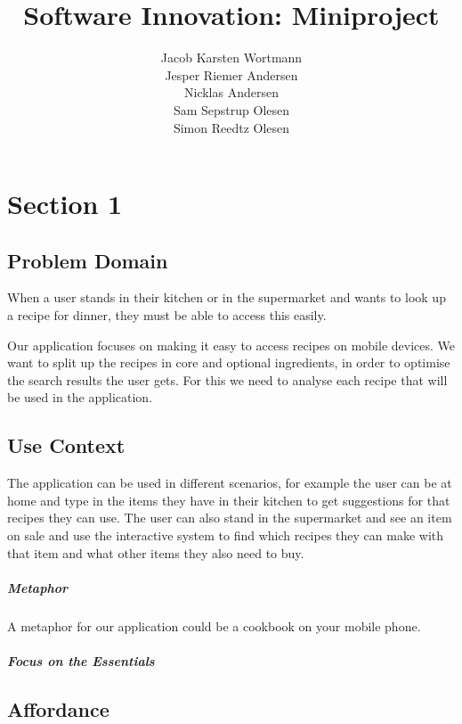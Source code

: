 \documentclass[a4paper,12pt]{memoir}
\title{Software Innovation: Miniproject}
\author{Jacob Karsten Wortmann\\Jesper Riemer Andersen\\Nicklas Andersen\\Sam Sepstrup Olesen\\Simon Reedtz Olesen}
\begin{document}
\maketitle

\chapter*{Section 1}

\section*{Problem Domain}

When a user stands in their kitchen or in the supermarket and wants to look up a recipe for dinner, they must be able to access this easily.

Our application focuses on making it easy to access recipes on mobile devices. We want to split up the recipes in core and optional ingredients, in order to optimise the search results the user gets. For this we need to analyse each recipe that will be used in the application.

\section*{Use Context}

The application can be used in different scenarios, for example the user can be at home and type in the items they have in their kitchen to get suggestions for that recipes they can use. The user can also stand in the supermarket and see an item on sale and use the interactive system to find which recipes they can make with that item and what other items they also need to buy. 

\paragraph{Metaphor}

A metaphor for our application could be a cookbook on your mobile phone. 

\paragraph{Focus on the Essentials}

\section*{Affordance}
\end{document}
